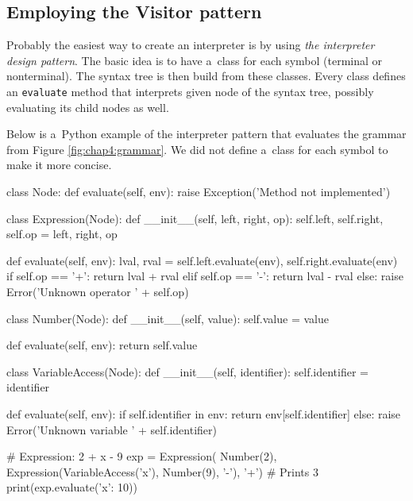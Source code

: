 \subsection{Employing the Visitor pattern}
Probably the easiest way to create an interpreter is by using \emph{the interpreter design pattern}. The basic idea is to have a~class for each symbol
(terminal or nonterminal). The syntax tree is then build from these classes. Every class defines an \texttt{evaluate} method that interprets given node
of the syntax tree, possibly evaluating its child nodes as well.

Below is a~Python example of the interpreter pattern that evaluates the grammar from Figure \ref{fig:chap4:grammar}. We did not define a~class for each
symbol to make it more concise.
\begin{code}
class Node:
    def evaluate(self, env):
        raise Exception('Method not implemented')

class Expression(Node):
    def __init__(self, left, right, op):
        self.left, self.right, self.op = left, right, op

    def evaluate(self, env):
        lval, rval = self.left.evaluate(env), self.right.evaluate(env)
        if self.op == '+':
            return lval + rval
        elif self.op == '-':
            return lval - rval
        else:
            raise Error('Unknown operator ' + self.op)

class Number(Node):
    def __init__(self, value):
        self.value = value
    
    def evaluate(self, env):
        return self.value

class VariableAccess(Node):
    def __init__(self, identifier):
        self.identifier = identifier
    
    def evaluate(self, env):
        if self.identifier in env:
            return env[self.identifier]
        else:
            raise Error('Unknown variable ' + self.identifier)

# Expression: 2 + x - 9
exp = Expression(
    Number(2),
    Expression(VariableAccess('x'), Number(9), '-'),
    '+')
# Prints 3
print(exp.evaluate({'x': 10}))
\end{code}

